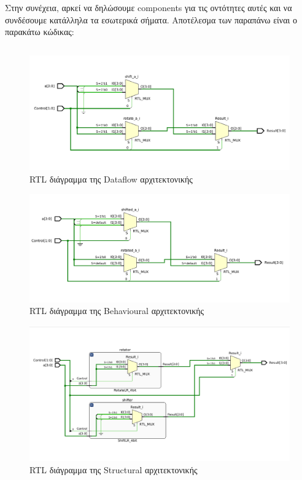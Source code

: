 \documentclass[11pt, a4paper]{report}
\begin{document}
Στην συνέχεια, αρκεί να δηλώσουμε components για τις οντότητες αυτές και να συνδέσουμε κατάλληλα τα εσωτερικά σήματα.
Αποτέλεσμα των παραπάνω είναι ο παρακάτω κώδικας:
\inputminted[breaklines, linenos, firstline=64]{vhdl}{./code/part-2/alu-2/alu.vhdl}

\newpage

\begin{figure}
  \includegraphics[width=\textwidth]{./images/alu-2/RLT_DF_2.png}
  \caption{RTL διάγραμμα της Dataflow αρχιτεκτονικής}
  \label{fig:df}
\end{figure}

\begin{figure}
  \includegraphics[width=\textwidth]{./images/alu-2/RTL_Beh_2.png}
  \caption{RTL διάγραμμα της Behavioural αρχιτεκτονικής}
  \label{fig:beh}
\end{figure}

\begin{figure}
  \includegraphics[width=\textwidth]{./images/alu-2/RTL_ALU_2.png}
  \caption{RTL διάγραμμα της Structural αρχιτεκτονικής}
  \label{fig:struct}
\end{figure}
\end{document}
